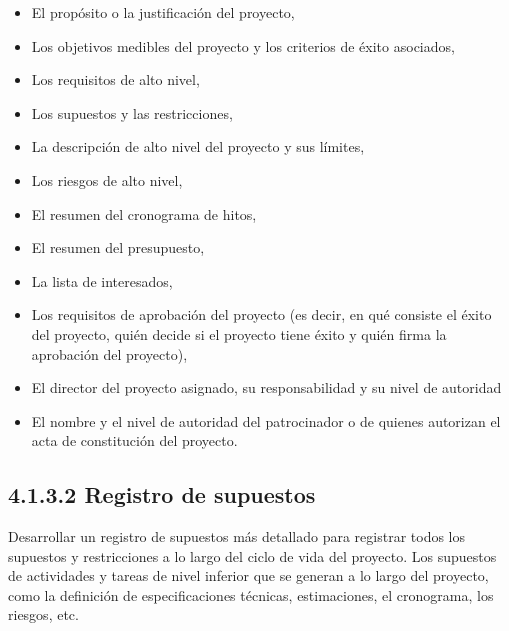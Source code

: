 \documentclass[letterpaper,12pt,openright,oneside]{article}
\theoremstyle{plain}
\begin{document}
\begin{itemize}
    \item El propósito o la justificación del proyecto,
    \item Los objetivos medibles del proyecto y los criterios de éxito asociados,
    \item Los requisitos de alto nivel,
    \item Los supuestos y las restricciones,
    \item La descripción de alto nivel del proyecto y sus límites,
    \item Los riesgos de alto nivel,
    \item El resumen del cronograma de hitos,
    \item El resumen del presupuesto,
    \item La lista de interesados,
    \item Los requisitos de aprobación del proyecto (es decir, en qué consiste el éxito del proyecto, quién decide si el proyecto tiene éxito y quién firma la aprobación del proyecto),
    \item El director del proyecto asignado, su responsabilidad y su nivel de autoridad
    \item El nombre y el nivel de autoridad del patrocinador o de quienes autorizan el acta de constitución del proyecto.
\end{itemize}
% 
% 
\subsection*{4.1.3.2 Registro de supuestos}

Desarrollar un registro de supuestos más detallado para registrar todos los supuestos y restricciones a lo largo del ciclo de vida del proyecto.
Los supuestos de actividades y tareas de nivel inferior que se generan a lo largo del proyecto, como la definición de especificaciones técnicas, estimaciones, el cronograma, los riesgos, etc. 

% 
% 
\end{document}
